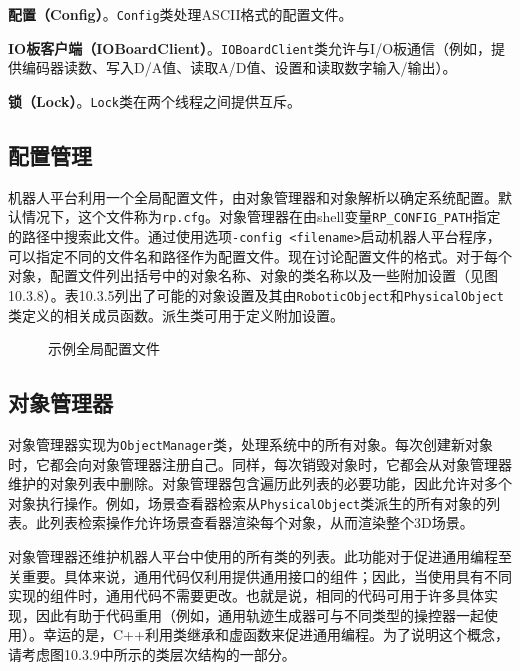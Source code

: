 \documentclass[UTF8,a4paper,12pt]{ctexart}
\begin{document}
\textbf{配置（Config）}。\texttt{Config}类处理ASCII格式的配置文件。

\textbf{IO板客户端（IOBoardClient）}。\texttt{IOBoardClient}类允许与I/O板通信（例如，提供编码器读数、写入D/A值、读取A/D值、设置和读取数字输入/输出）。

\textbf{锁（Lock）}。\texttt{Lock}类在两个线程之间提供互斥。

\subsection{配置管理}

机器人平台利用一个全局配置文件，由对象管理器和对象解析以确定系统配置。默认情况下，这个文件称为\texttt{rp.cfg}。对象管理器在由shell变量\texttt{RP\_CONFIG\_PATH}指定的路径中搜索此文件。通过使用选项\texttt{-config <filename>}启动机器人平台程序，可以指定不同的文件名和路径作为配置文件。现在讨论配置文件的格式。对于每个对象，配置文件列出括号中的对象名称、对象的类名称以及一些附加设置（见图10.3.8）。表10.3.5列出了可能的对象设置及其由\texttt{RoboticObject}和\texttt{PhysicalObject}类定义的相关成员函数。派生类可用于定义附加设置。

\begin{figure}[htbp]
\centering
{}
\caption{示例全局配置文件}
\label{fig:10.3.8}
\end{figure}

\subsection{对象管理器}

对象管理器实现为\texttt{ObjectManager}类，处理系统中的所有对象。每次创建新对象时，它都会向对象管理器注册自己。同样，每次销毁对象时，它都会从对象管理器维护的对象列表中删除。对象管理器包含遍历此列表的必要功能，因此允许对多个对象执行操作。例如，场景查看器检索从\texttt{PhysicalObject}类派生的所有对象的列表。此列表检索操作允许场景查看器渲染每个对象，从而渲染整个3D场景。

对象管理器还维护机器人平台中使用的所有类的列表。此功能对于促进通用编程至关重要。具体来说，通用代码仅利用提供通用接口的组件；因此，当使用具有不同实现的组件时，通用代码不需要更改。也就是说，相同的代码可用于许多具体实现，因此有助于代码重用（例如，通用轨迹生成器可与不同类型的操控器一起使用）。幸运的是，C++利用类继承和虚函数来促进通用编程。为了说明这个概念，请考虑图10.3.9中所示的类层次结构的一部分。
\end{document}
